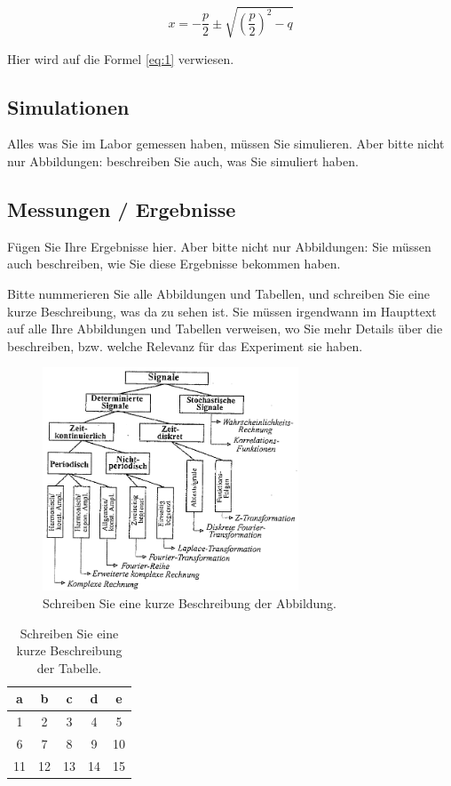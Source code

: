 \documentclass[12pt,a4paper]{article}
\begin{document}
	\begin{equation}\label{eq:1}
		x=-\frac{p}{2}\pm\sqrt{\left(\frac{p}{2}\right)^2-q}
	\end{equation}

	Hier wird auf die Formel  \ref{eq:1} verwiesen. %

	\subsection{Simulationen}
	Alles was Sie im Labor gemessen haben, müssen Sie 
	simulieren. Aber bitte nicht nur Abbildungen: beschreiben 
	Sie auch, was Sie simuliert haben.
		
	\pagebreak

	\subsection{Messungen / Ergebnisse}
	Fügen Sie Ihre Ergebnisse hier. Aber bitte nicht nur Abbildungen: Sie müssen auch beschreiben, wie Sie diese Ergebnisse 
	bekommen haben.
	
	Bitte nummerieren Sie alle Abbildungen und Tabellen, und schreiben Sie eine kurze Beschreibung, was da zu sehen ist. Sie müssen 
	irgendwann im Haupttext auf alle Ihre Abbildungen und Tabellen verweisen, wo Sie mehr Details über die beschreiben, bzw. 
	welche Relevanz für das Experiment sie haben.
	
	\begin{figure}[H]
		\centering
		\includegraphics[width=3in]{signale_math_methoden.png}
		\caption{Schreiben Sie eine kurze Beschreibung der Abbildung.}
		\label{figure:1}
	\end{figure}
	
	\begin{table}[H]
		\centering
		\begin{tabular}{|c|c|c|c|c|}
			\hline
			a&b  &c  &d  &e     \\
			\hline
			\hline
			1&2  &3  &4  &5     \\
			6&7  &8  & 9 &10    \\
			11&12  &13  &14  &15\\
			\hline              
		\end{tabular}
	\caption{Schreiben Sie eine kurze Beschreibung der Tabelle.}
	\label{table:1}
	\end{table}
	
\end{document}
